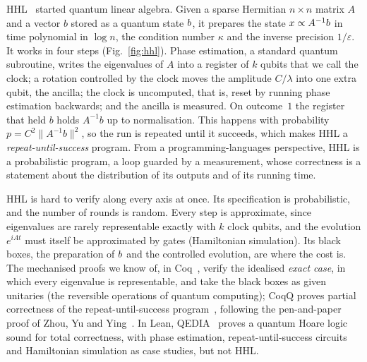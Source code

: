 \documentclass[acmsmall,nonacm,screen,11pt]{acmart}
\let\ket\relax\let\bra\relax\let\braket\relax\let\ketbra\relax
\newcommand{\ket}[1]{|#1\rangle}
\newcommand{\bra}[1]{\langle #1|}
\newcommand{\ketbra}[2]{|#1\rangle\langle #2|}
\newcommand{\norm}[1]{\|#1\|}
\begin{document}
HHL~\cite{hhl2009} started quantum linear algebra. Given a sparse Hermitian $n\times n$ matrix $A$
and a vector $b$ stored as a quantum state $\ket b$, it prepares the state $\ket x\propto A^{-1}\ket b$
in time polynomial in $\log n$, the condition number $\kappa$ and the inverse precision
$1/\varepsilon$. It works in four steps (Fig.~\ref{fig:hhl}). Phase estimation, a standard quantum
subroutine, writes the eigenvalues of $A$ into a register of $k$ qubits that we call the clock; a
rotation controlled by the clock moves the amplitude $C/\lambda$ into one extra qubit, the ancilla;
the clock is uncomputed, that is, reset by running phase estimation backwards; and the ancilla is
measured. On outcome~$1$ the register that held $b$ holds $A^{-1}b$ up to normalisation. This happens
with probability $p=C^2\norm{A^{-1}b}^2$, so the run is repeated until it succeeds, which makes HHL a
\emph{repeat-until-success} program. From a programming-languages perspective, HHL is a probabilistic
program, a loop guarded by a measurement, whose correctness is a statement about the distribution of
its outputs and of its running time.

HHL is hard to verify along every axis at once. Its specification is probabilistic, and the number
of rounds is random. Every step is approximate, since eigenvalues are rarely representable exactly with $k$
clock qubits, and the evolution $e^{iAt}$ must itself be approximated by gates (Hamiltonian
simulation). Its black boxes, the preparation of $\ket b$ and the controlled
evolution, are where the cost is. The mechanised proofs we know of, in Coq~\cite{zhou2023coqq,wu2024local}, verify
the idealised \emph{exact case}, in which every eigenvalue is representable, and take the black boxes
as given unitaries (the reversible operations of quantum computing); CoqQ proves partial correctness of the repeat-until-success program~\cite{zhou2023coqq},
following the pen-and-paper proof of Zhou, Yu and Ying~\cite{zhou2019applied}. In Lean,
QEDIA~\cite{ren2026qedia} proves a quantum Hoare logic sound for total correctness, with phase
estimation, repeat-until-success circuits and Hamiltonian simulation as case studies, but not HHL.
\end{document}
